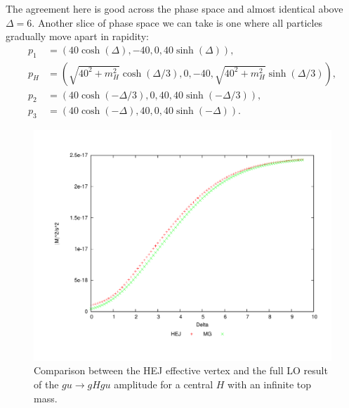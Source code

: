 The agreement here is good across the phase space and almost identical above $\Delta = 6$. Another slice of phase space we can take is one where all particles gradually move apart in rapidity:
\begin{subequations}
\begin{align}
p_1 &= (40 \cosh(\Delta),-40,0,40 \sinh(\Delta)), \\
p_H &= (\sqrt{40^2+m_H^2} \cosh(\Delta/3), 0,-40,\sqrt{40^2+m_H^2}  \sinh(\Delta/3)), \\
p_2 &= (40 \cosh(-\Delta/3),0,40,40 \sinh(-\Delta/3)), \\
p_3 &= (40 \cosh(-\Delta),40,0,40 \sinh(-\Delta)).
\end{align}
\end{subequations}
\begin{figure}[t]
\centering
\includegraphics[scale=0.45]{Images/ug_cen.pdf}
\caption{Comparison between the HEJ effective vertex and the full LO result of the $gu \to gHgu$ amplitude for a central $H$ with an infinite top mass.}
\label{fig:ug_cen}
\end{figure}


